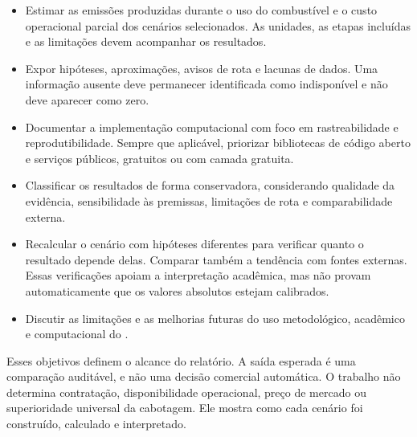 \begin{itemize}
  \item Estimar as emissões produzidas durante o uso do combustível e o custo operacional parcial dos cenários selecionados. As unidades, as etapas incluídas e as limitações devem acompanhar os resultados.
  \item Expor hipóteses, aproximações, avisos de rota e lacunas de dados. Uma informação ausente deve permanecer identificada como indisponível e não deve aparecer como zero.
  \item Documentar a implementação computacional com foco em rastreabilidade e reprodutibilidade. Sempre que aplicável, priorizar bibliotecas de código aberto e serviços públicos, gratuitos ou com camada gratuita.
  \item Classificar os resultados de forma conservadora, considerando qualidade da evidência, sensibilidade às premissas, limitações de rota e comparabilidade externa.
  \item Recalcular o cenário com hipóteses diferentes para verificar quanto o resultado depende delas. Comparar também a tendência com fontes externas. Essas verificações apoiam a interpretação acadêmica, mas não provam automaticamente que os valores absolutos estejam calibrados.
  \item Discutir as limitações e as melhorias futuras do uso metodológico, acadêmico e computacional do \CabotageLens{}.
\end{itemize}

Esses objetivos definem o alcance do relatório. A saída esperada é uma comparação auditável, e não uma decisão comercial automática. O trabalho não determina contratação, disponibilidade operacional, preço de mercado ou superioridade universal da cabotagem. Ele mostra como cada cenário foi construído, calculado e interpretado.
